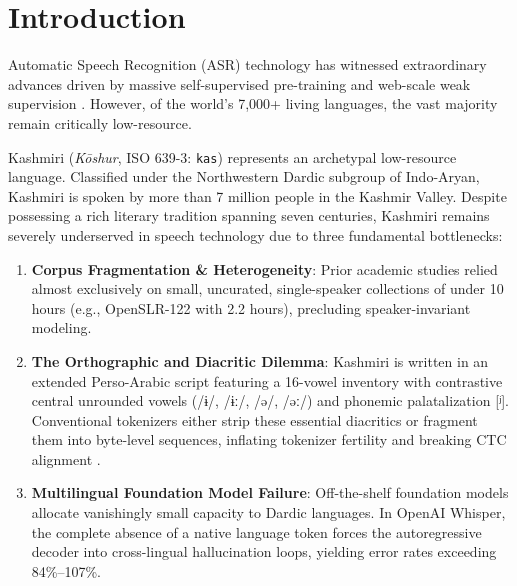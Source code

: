 \documentclass[11pt,a4paper]{article}
\begin{document}
\begin{abstract}
Finally, we analyze search space dynamics: restoring beam width 16 with history pruning eliminates an 84-word search penalty, while KenLM calibration ($\alpha=0.20, \beta=-0.50$) and Candidate-Relative Sequence Ranking modestly lower errors to \textbf{24.27\%--24.30\%} ($p = 0.0847$). An $N$-best oracle analysis reveals an oracle WER ceiling of \textbf{19.23\% (3,240 errors)}, demonstrating that 881 word errors (21.4\% of total errors) represent recoverable search headroom. We release our complete code provenance, audited manifests, and replication pipelines to establish a reproducible standard for Dardic speech processing.
\end{abstract}

\section{Introduction}
Automatic Speech Recognition (ASR) technology has witnessed extraordinary advances driven by massive self-supervised pre-training and web-scale weak supervision \cite{baevski2020wav2vec2, radford2023whisper}. However, of the world's 7,000+ living languages, the vast majority remain critically low-resource.

Kashmiri (\textit{Kōshur}, ISO 639-3: \texttt{kas}) represents an archetypal low-resource language. Classified under the Northwestern Dardic subgroup of Indo-Aryan, Kashmiri is spoken by more than 7 million people in the Kashmir Valley. Despite possessing a rich literary tradition spanning seven centuries, Kashmiri remains severely underserved in speech technology due to three fundamental bottlenecks:
\begin{enumerate}
    \item \textbf{Corpus Fragmentation \& Heterogeneity}: Prior academic studies relied almost exclusively on small, uncurated, single-speaker collections of under 10 hours (e.g., OpenSLR-122 with 2.2 hours), precluding speaker-invariant modeling.
    \item \textbf{The Orthographic and Diacritic Dilemma}: Kashmiri is written in an extended Perso-Arabic script featuring a 16-vowel inventory with contrastive central unrounded vowels (/ɨ/, /ɨː/, /ə/, /əː/) and phonemic palatalization [ʲ]. Conventional tokenizers either strip these essential diacritics or fragment them into byte-level sequences, inflating tokenizer fertility and breaking CTC alignment \cite{petrov2023tokenization}.
    \item \textbf{Multilingual Foundation Model Failure}: Off-the-shelf foundation models allocate vanishingly small capacity to Dardic languages. In OpenAI Whisper, the complete absence of a native language token forces the autoregressive decoder into cross-lingual hallucination loops, yielding error rates exceeding 84\%--107\%.
\end{enumerate}
\end{document}
